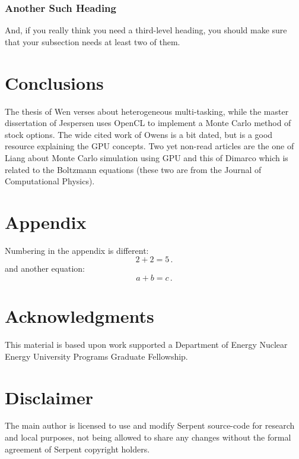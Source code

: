 \documentclass[twoside,a4paper,12pt,english]{anstrans}
\begin{document}
\subsubsection{Another Such Heading}
And, if you really think you need a third-level heading, you should make sure
that your subsection needs at least two of them.

\section{Conclusions}

The thesis of Wen \cite{Wen2017} verses about heterogeneous multi-tasking, while
the master dissertation of Jespersen \cite{Jespersen2015} uses OpenCL to implement
a Monte Carlo method of stock options. The wide cited work of Owens \cite{Owens2007}
is a bit dated, but is a good resource explaining the GPU concepts. Two yet non-read articles
are the one of Liang \cite{Liang2017} about Monte Carlo simulation using GPU and this of Dimarco
\cite{Dimarco2017} which is related to the Boltzmann equations (these two are from the Journal
of Computational Physics).

\appendix
\section{Appendix}

Numbering in the appendix is different:
\begin{equation} \label{eq:appendix}
  2 + 2 = 5\,.
\end{equation}
and another equation:
\begin{equation} \label{eq:appendix2}
  a + b = c\,.
\end{equation}

\section{Acknowledgments}
This material is based upon work supported a Department of Energy Nuclear
Energy University Programs Graduate Fellowship.

\section{Disclaimer}
The main author is licensed to use and modify Serpent source-code for research
and local purposes, not being allowed to share any changes without the formal
agreement of Serpent copyright holders.


\end{document}
